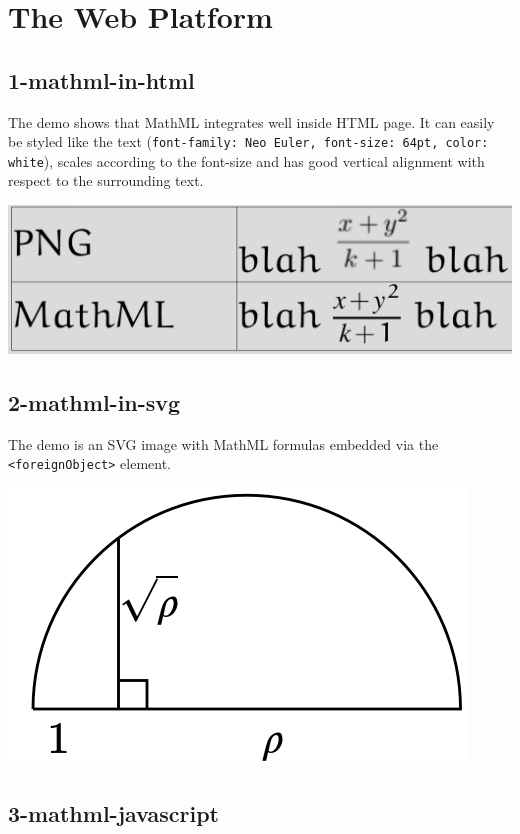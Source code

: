 \appendix

\section{The Web Platform}

\subsection{1-mathml-in-html}

The demo shows that MathML integrates well inside HTML page. It can easily be 
styled like the text ({\tt font-family: Neo Euler, font-size: 64pt, color: white}), 
scales according to the font-size and has good vertical alignment with respect 
to the surrounding text. 

\href{http://fred-wang.github.io/MathUI2014/demos/1-mathml-in-html.html}{\includegraphics[width=\textwidth]{screenshots/1-mathml-in-html}}

\subsection{2-mathml-in-svg}

The demo is an SVG image with MathML formulas embedded via the
{\tt <foreignObject>} element.

\includegraphics{screenshots/2-mathml-in-svg}

\subsection{3-mathml-javascript}

